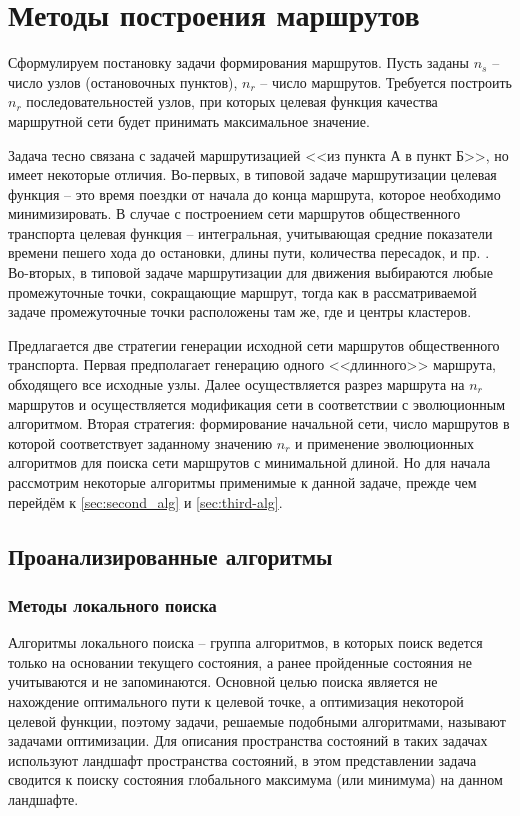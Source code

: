\chapter{Методы построения маршрутов}\label{chp:methods}
Сформулируем постановку задачи формирования маршрутов. Пусть заданы \( n_s \) -- число узлов (остановочных 
пунктов), \( n_r \) -- число маршрутов. Требуется построить \( n_r \) последовательностей узлов, при которых 
целевая функция качества маршрутной сети будет принимать максимальное значение. 

Задача тесно связана с задачей маршрутизацией <<из пункта А в пункт Б>>, но имеет некоторые отличия. 
Во-первых, в типовой задаче маршрутизации целевая функция -- это время поездки от начала до конца маршрута, 
которое необходимо минимизировать. В случае с построением сети маршрутов общественного транспорта целевая 
функция -- интегральная, учитывающая средние показатели времени пешего хода до остановки, длины пути, 
количества пересадок, и пр. \cite{bib:9,bib:17}. Во-вторых, в типовой задаче маршрутизации для движения 
выбираются любые промежуточные точки, сокращающие маршрут, тогда как в рассматриваемой задаче промежуточные 
точки расположены там же, где и центры кластеров.

Предлагается две стратегии генерации исходной сети маршрутов общественного транспорта. Первая предполагает 
генерацию одного <<длинного>> маршрута, обходящего все исходные узлы. Далее осуществляется разрез маршрута 
на \( n_r \) маршрутов и осуществляется модификация сети в соответствии с эволюционным алгоритмом. Вторая 
стратегия: формирование начальной сети, число маршрутов в которой соответствует заданному значению \( n_r \) 
и применение эволюционных алгоритмов для поиска сети маршрутов с минимальной длиной. Но для начала рассмотрим 
некоторые алгоритмы применимые к данной задаче, прежде чем перейдём к \ref{sec:second_alg} и 
\ref{sec:third-alg}.

\section{Проанализированные алгоритмы}
\subsection{Методы локального поиска}
Алгоритмы локального поиска -- группа алгоритмов, в которых поиск ведется только на основании текущего 
состояния, а ранее пройденные состояния не учитываются и не запоминаются. Основной целью поиска является не 
нахождение оптимального пути к целевой точке, а оптимизация некоторой целевой функции, поэтому задачи, 
решаемые подобными алгоритмами, называют задачами оптимизации. Для описания пространства состояний в таких 
задачах используют ландшафт пространства состояний, в этом представлении задача сводится к поиску состояния 
глобального максимума (или минимума) на данном ландшафте.

